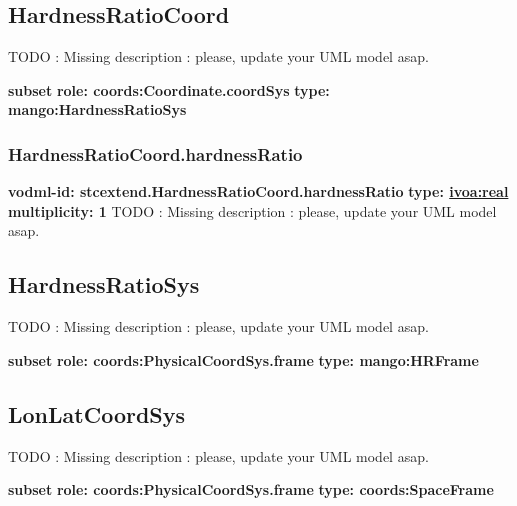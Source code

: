   \subsection{HardnessRatioCoord}
  \label{sect:stcextend.HardnessRatioCoord}
    TODO : Missing description : please, update your UML model asap.

    \noindent \textbf{subset} \newline
    \indent   \textbf{role: coords:Coordinate.coordSys} \newline
    \indent   \textbf{type: mango:HardnessRatioSys} \newline


    \subsubsection{HardnessRatioCoord.hardnessRatio}
      \textbf{vodml-id: stcextend.HardnessRatioCoord.hardnessRatio} \newline
      \textbf{type: \hyperref[sect:ivoa]{ivoa:real}} \newline
      \textbf{multiplicity: 1} \newline 
      TODO : Missing description : please, update your UML model asap.

  \subsection{HardnessRatioSys}
  \label{sect:stcextend.HardnessRatioSys}
    TODO : Missing description : please, update your UML model asap.

    \noindent \textbf{subset} \newline
    \indent   \textbf{role: coords:PhysicalCoordSys.frame} \newline
    \indent   \textbf{type: mango:HRFrame} \newline


  \subsection{LonLatCoordSys}
  \label{sect:stcextend.LonLatCoordSys}
    TODO : Missing description : please, update your UML model asap.

    \noindent \textbf{subset} \newline
    \indent   \textbf{role: coords:PhysicalCoordSys.frame} \newline
    \indent   \textbf{type: coords:SpaceFrame} \newline


